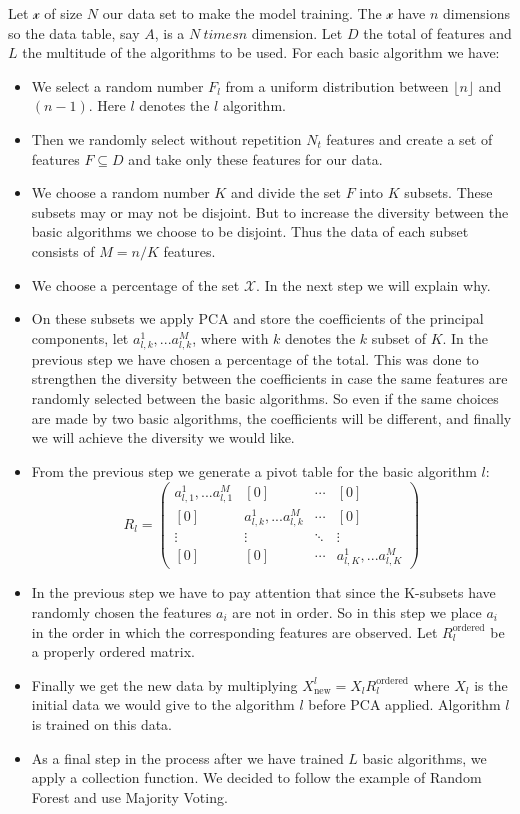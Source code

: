 \documentclass[a4paper,12pt]{report}
\theoremstyle{definitionNODot}
\begin{document}
	Let $\mathcal{x}$ of size $N$ our data set to make the model training. The $ \mathcal{x}$ have $ n $ dimensions so the data table, say $ A $, is a $ N \ times n $ dimension. Let $ D $ the total of features and $ L $ the multitude of the algorithms to be used. For each basic algorithm we have:
	\begin{itemize}
		\item We select a random number $F_l$ from a uniform distribution between $\lfloor n \rfloor$ and $(n-1)$. Here $l$ denotes the $l$ algorithm.
		\item Then we randomly select without repetition $N_t$ features and create a set of features $F\subseteq D$ and take only these features for our data.
		\item We choose a random number $K$ and divide the set $F$ into $K$ subsets. These subsets may or may not be disjoint. But to increase the diversity between the basic algorithms we choose to be disjoint. Thus the data of each subset consists of $M=n/K$ features.
		\item We choose a percentage of the set $\mathcal{X}$. In the next step we will explain why.
		\item On these subsets we apply PCA and store the coefficients of the principal components, let $a_{l,k}^{1},...a_{l,k}^{M}$, where with $k $ denotes the $k$ subset of $K$. In the previous step we have chosen a percentage of the total. This was done to strengthen the diversity between the coefficients in case the same features are randomly selected between the basic algorithms. So even if the same choices are made by two basic algorithms, the coefficients will be different, and finally we will achieve the diversity we would like.
		\item From the previous step we generate a pivot table for the basic algorithm $l$:
		\[
		R_l = 
		\begin{pmatrix}
			a_{l,1}^{1},...a_{l,1}^{M} & [0] & \cdots & [0] \\
			[0] & a_{l,k}^{1},...a_{l,k}^{M} & \cdots & [0] \\
			\vdots & \vdots & \ddots & \vdots \\
			[0] & [0] & \cdots & a_{l,K}^{1},...a_{l,K}^{M}
		\end{pmatrix}		
		\]
		\item In the previous step we have to pay attention that since the K-subsets have randomly chosen the features $a_i$ are not in order. So in this step we place $a_i$ in the order in which the corresponding features are observed. Let $R^{\text{ordered}}_l$ be a properly ordered matrix.
		\item Finally we get the new data by multiplying $X^l_\text{new} = X_l R^{\text{ordered}}_l$ where $X_l$ is the initial data we would give to the algorithm $l$ before PCA applied. Algorithm $l$ is trained on this data.
		\item As a final step in the process after we have trained $L$ basic algorithms, we apply a collection function. We decided to follow the example of Random Forest and use Majority Voting.
	\end{itemize}
\end{document}
